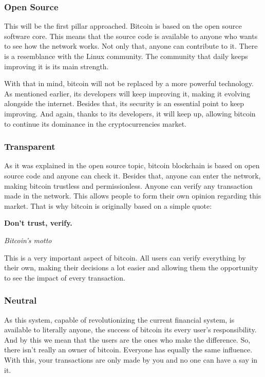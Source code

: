 \documentclass{article}
\newcommand\tab[1][1cm]{\hspace*{#1}}
\begin{document}
\subsubsection{Open Source}

\tab This will be the first pillar approached. Bitcoin is based on the open source software core. This means that the source code is available to anyone who wants to see how the network works. Not only that, anyone can contribute to it. There is a resemblance with the Linux community. The community that daily keeps improving it is its main strength.

With that in mind, bitcoin will not be replaced by a more powerful technology. As mentioned earlier, its developers will keep improving it, making it evolving alongside the internet. Besides that, its security is an essential point to keep improving. And again, thanks to its developers, it will keep up, allowing bitcoin to continue its dominance in the cryptocurrencies market.

\subsubsection{Transparent}

\tab As it was explained in the open source topic, bitcoin blockchain is based on open source code and anyone can check it. Besides that, anyone can enter the network, making bitcoin trustless and permissionless. Anyone can verify any transaction made in the network. This allows people to form their own opinion regarding this market. That is why bitcoin is originally based on a simple quote:

\renewcommand{\epigraphflush}{center}
\epigraph{\textbf{Don't trust, verify.}}{\textit{Bitcoin's motto}}

This is a very important aspect of bitcoin. All users can verify everything by their own, making their decisions a lot easier and allowing them the opportunity to see the impact of every transaction.


\subsubsection{Neutral}

\tab As this system, capable of revolutionizing the current financial system, is available to literally anyone, the success of bitcoin its every user's responsibility. And by this we mean that the users are the ones who make the difference. So, there isn't really an owner of bitcoin. Everyone has equally the same influence. With this, your transactions are only made by you and no one can have a say in it. 
\end{document}
